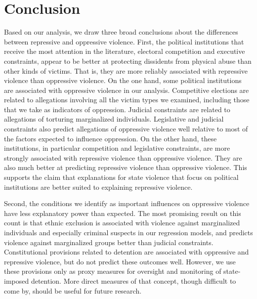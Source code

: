 \documentclass[11pt]{article}
\begin{document}

\section*{Conclusion}

Based on our analysis, we draw three broad conclusions about the differences between repressive and oppressive violence. First, the political institutions that receive the most attention in the literature, electoral competition and executive constraints, appear to be better at protecting dissidents from physical abuse than other kinds of victims. That is, they are more reliably associated with repressive violence than oppressive violence. On the one hand, some political institutions are associated with oppressive violence in our analysis. Competitive elections are related to allegations involving all the victim types we examined, including those that we take as indicators of oppression. Judicial constraints are related to allegations of torturing marginalized individuals. Legislative and judicial constraints also predict allegations of oppressive violence well relative to most of the factors expected to influence oppression. On the other hand, these institutions, in particular competition and legislative constraints, are more strongly associated with repressive violence than oppressive violence. They are also much better at predicting repressive violence than oppressive violence. This supports the claim that explanations for state violence that focus on political institutions are better suited to explaining repressive violence. 

Second, the conditions we identify as important influences on oppressive violence have less explanatory power than expected. The most promising result on this count is that ethnic exclusion is associated with violence against marginalized individuals and especially criminal suspects in our regression models, and predicts violence against marginalized groups better than judicial constraints. Constitutional provisions related to detention are associated with oppressive and repressive violence, but do not predict these outcomes well. However, we use these provisions only as proxy measures for oversight and monitoring of state-imposed detention. More direct measures of that concept, though difficult to come by, should be useful for future research.     
\end{document}
